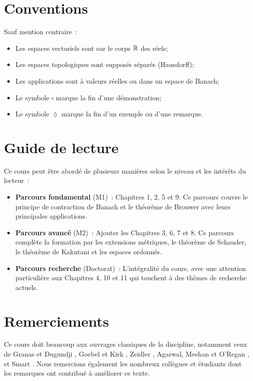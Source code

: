 \section*{Conventions}

Sauf mention contraire~:
\begin{itemize}
    \item Les espaces vectoriels sont sur le corps $\mathbb{R}$ des r\'eels;
    \item Les espaces topologiques sont suppos\'es s\'epar\'es (Hausdorff);
    \item Les applications sont \`a valeurs r\'eelles ou dans un espace de Banach;
    \item Le symbole $\square$ marque la fin d'une d\'emonstration;
    \item Le symbole $\lozenge$ marque la fin d'un exemple ou d'une remarque.
\end{itemize}

\section*{Guide de lecture}

Ce cours peut \^etre abord\'e de plusieurs mani\`eres selon le niveau et les
int\'er\^ets du lecteur~:

\begin{itemize}
    \item \textbf{Parcours fondamental} (M1)~: Chapitres 1, 2, 5 et 9. Ce parcours
          couvre le principe de contraction de Banach et le th\'eor\`eme de Brouwer
          avec leurs principales applications.
    \item \textbf{Parcours avanc\'e} (M2)~: Ajouter les Chapitres 3, 6, 7 et 8.
          Ce parcours compl\`ete la formation par les extensions m\'etriques, le
          th\'eor\`eme de Schauder, le th\'eor\`eme de Kakutani et les espaces ordonn\'es.
    \item \textbf{Parcours recherche} (Doctorat)~: L'int\'egralit\'e du cours,
          avec une attention particuli\`ere aux Chapitres 4, 10 et 11 qui touchent
          \`a des th\`emes de recherche actuels.
\end{itemize}

\section*{Remerciements}

Ce cours doit beaucoup aux ouvrages classiques de la discipline, notamment ceux
de Granas et Dugundji \cite{granas2003}, Goebel et Kirk \cite{goebel1990},
Zeidler \cite{zeidler1986}, Agarwal, Meehan et O'Regan \cite{agarwal2001},
et Smart \cite{smart1974}. Nous remercions \'egalement les nombreux coll\`egues
et \'etudiants dont les remarques ont contribu\'e \`a am\'eliorer ce texte.

